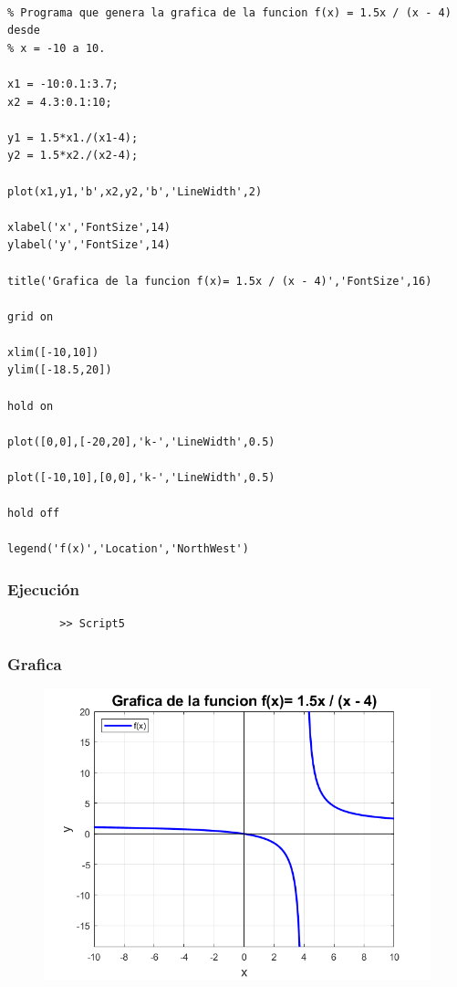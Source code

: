 \documentclass{article}
\begin{document}
	\begin{lstlisting}
		
% Programa que genera la grafica de la funcion f(x) = 1.5x / (x - 4) desde
% x = -10 a 10.

x1 = -10:0.1:3.7;
x2 = 4.3:0.1:10;

y1 = 1.5*x1./(x1-4);
y2 = 1.5*x2./(x2-4);

plot(x1,y1,'b',x2,y2,'b','LineWidth',2)

xlabel('x','FontSize',14)
ylabel('y','FontSize',14)

title('Grafica de la funcion f(x)= 1.5x / (x - 4)','FontSize',16)

grid on

xlim([-10,10])
ylim([-18.5,20])

hold on

plot([0,0],[-20,20],'k-','LineWidth',0.5)

plot([-10,10],[0,0],'k-','LineWidth',0.5)

hold off

legend('f(x)','Location','NorthWest')

	\end{lstlisting}
	
	\subsubsection{Ejecución}
	
	\begin{lstlisting}
		>> Script5
	\end{lstlisting}
	
	\newpage
	
	\subsubsection{Grafica}
	
	\begin{figure}[h]
		\centering
		\includegraphics[width=\textwidth]{grafica5.png}
	\end{figure}
	
\end{document}
